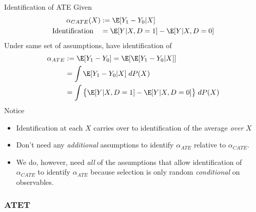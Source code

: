 \documentclass[aspectratio=169, handout]{beamer}
\begin{document}
{\footnotesize
\begin{frame}{Identification of ATE}
Given
\begin{align*}
  \alpha_{CATE}(X)
  &:=
  \E[Y_1-Y_0|X]
  \\
  \text{Identification}
  \quad
  &=
  \E[Y|X,D=1]
  -
  \E[Y|X,D=0]
\end{align*}
\pause
Under same set of assumptions, have identification of
\begin{align*}
  \alpha_{ATE}
  &:=
  \E[Y_1-Y_0]
  =
  \E[\E[Y_1-Y_0|X]]
  \\
  &=
  \int
  \E[Y_1-Y_0|X]
  \;dP(X)
  \\
  &=
  \int
  \big\{
  \E[Y|X,D=1]
  -
  \E[Y|X,D=0]
  \big\}
  \;dP(X)
\end{align*}
\pause
Notice
\begin{itemize}
  \item Identification at each $X$ carries over to identification of the
    average \emph{over} $X$
  \item Don't need any \emph{additional} assumptions to identify
    $\alpha_{ATE}$ relative to $\alpha_{CATE}$.
  \pause
  \item We do, however, need \emph{all} of the assumptions that allow
    identification of $\alpha_{CATE}$ to identify $\alpha_{ATE}$ because
    selection is only random \emph{conditional} on observables.
\end{itemize}
\end{frame}
}



\subsubsection{ATET}
\end{document}
